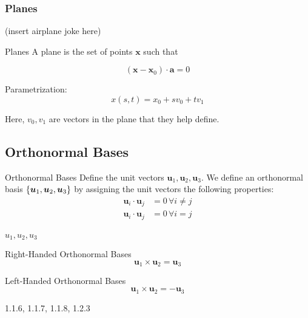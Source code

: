 \documentclass[11pt]{article}
\begin{document}
\subsubsection{Planes}
(insert airplane joke here)


\begin{definition}{Planes}
  A plane is the set of points $\bm{x}$ such that
  
  $$(\bm{x} - \bm{x}_0) \cdot \bm{a} = 0$$

  Parametrization:
  $$x(s, t) = x_0 + s v_0 + t v_1$$

  Here, $v_0, v_1$ are vectors in the plane that they help define.
  
\end{definition}







\subsection{Orthonormal Bases}

\begin{definition}{Orthonormal Bases}
  Define the unit vectors $\bm{u}_1, \bm{u}_2, \bm{u}_3$.
  We define an orthonormal basis $\left \{ \bm{u}_1, \bm{u}_2, \bm{u}_3 \right \}$ by assigning the unit vectors the following properties:
  \begin{align*}
    \bm{u}_i \cdot \bm{u}_j &= 0\, \forall i \neq j \\
    \bm{u}_i \cdot \bm{u}_j &= 0\, \forall i = j \\
  \end{align*}
\end{definition}

$u_1, u_2, u_3$

\begin{definition}{Right-Handed Orthonormal Bases}
  $$
  \bm{u}_1 \times \bm{u}_2 = \bm{u}_3
  $$
\end{definition}

\begin{definition}{Left-Handed Orthonormal Bases}
  $$
  \bm{u}_1 \times \bm{u}_2 = - \bm{u}_3
  $$
\end{definition}




1.1.6, 1.1.7, 1.1.8, 1.2.3

\end{document}

